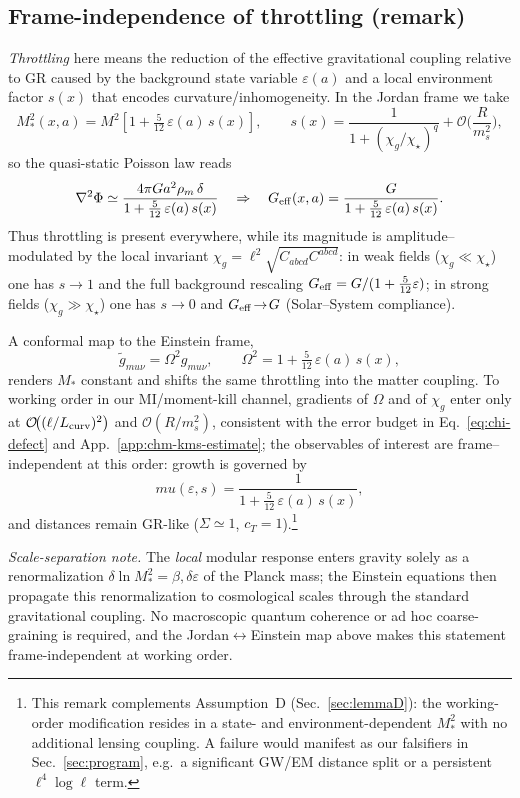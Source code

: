 \documentclass[aps,prd,onecolumn,superscriptaddress,nofootinbib]{revtex4-2}
\def\mu{mu}%
\def\Omega_\Lambda{OmegaLambda}%
\begin{document}
\subsection{Frame-independence of throttling (remark)}
\label{sec:throttle-remark}
\emph{Throttling} here means the reduction of the effective gravitational coupling relative to GR caused by the background state variable \(\varepsilon(a)\) and a local environment factor \(s(x)\) that encodes curvature/inhomogeneity.
In the Jordan frame we take
\[
M_*^2(x,a)=M^2\!\left[1+\tfrac{5}{12}\,\varepsilon(a)\,s(x)\right],\qquad
s(x)=\frac{1}{1+(\chi_g/\chi_\star)^q}+\mathcal O\!\Big(\frac{R}{m_s^2}\Big),
\]
so the quasi-static Poisson law reads
\[
\nabla^2\Phi \simeq \frac{4\pi G a^2 \rho_m\,\delta}{1+\tfrac{5}{12}\,\varepsilon(a)\,s(x)}
\quad\Rightarrow\quad
G_{\rm eff}(x,a)=\frac{G}{1+\tfrac{5}{12}\,\varepsilon(a)\,s(x)}.
\]
Thus throttling is present everywhere, while its magnitude is amplitude–modulated by the local invariant \(\chi_g=\ell^2\sqrt{C_{abcd}C^{abcd}}\): in weak fields (\(\chi_g\!\ll\!\chi_\star\)) one has \(s\!\to\!1\) and the full background rescaling \(G_{\rm eff}=G/(1+\tfrac{5}{12}\varepsilon)\); in strong fields (\(\chi_g\!\gg\!\chi_\star\)) one has \(s\!\to\!0\) and \(G_{\rm eff}\!\to\!G\) (Solar–System compliance).

A conformal map to the Einstein frame,
\[
\tilde g_{\mu\nu}=\Omega^2 g_{\mu\nu},\qquad \Omega^2=1+\tfrac{5}{12}\,\varepsilon(a)\,s(x),
\]
renders \(M_*\) constant and shifts the same throttling into the matter coupling. To working order in our MI/moment-kill channel, gradients of \(\Omega\) and of \(\chi_g\) enter only at \(\mathcal O\!\big((\ell/L_{\rm curv})^2\big)\) and \(\mathcal O(R/m_s^2)\), consistent with the error budget in Eq.~\eqref{eq:chi-defect} and App.~\ref{app:chm-kms-estimate}; the observables of interest are frame–independent at this order: growth is governed by
\[
\mu(\varepsilon,s)=\frac{1}{1+\tfrac{5}{12}\,\varepsilon(a)\,s(x)},
\]
and distances remain GR-like (\(\Sigma\simeq 1\), \(c_T=1\)).\footnote{This remark complements Assumption~D (Sec.~\ref{sec:lemmaD}): the working-order modification resides in a state- and environment-dependent \(M_*^2\) with no additional lensing coupling. A failure would manifest as our falsifiers in Sec.~\ref{sec:program}, e.g.\ a significant GW/EM distance split or a persistent \(\ell^4\log\ell\) term.}

\noindent\emph{Scale-separation note.} The \emph{local} modular response enters gravity solely as a renormalization \(\delta\!\ln M_*^2=\beta,\delta\varepsilon\) of the Planck mass; the Einstein equations then propagate this renormalization to cosmological scales through the standard gravitational coupling. No macroscopic quantum coherence or ad hoc coarse-graining is required, and the Jordan\(\leftrightarrow\)Einstein map above makes this statement frame-independent at working order.
\end{document}
